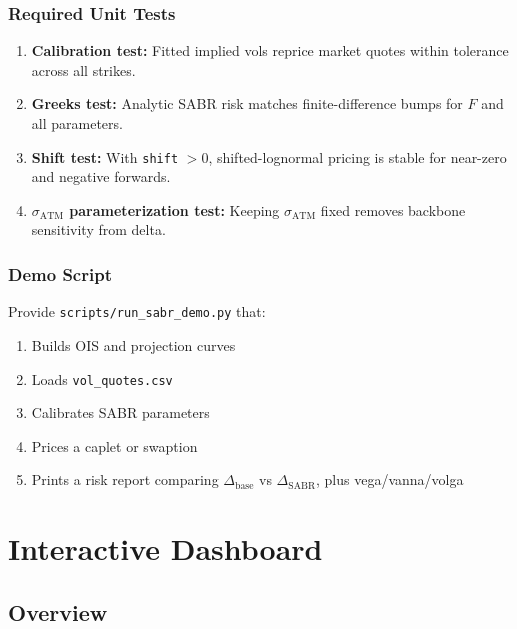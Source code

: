 \documentclass[12pt,a4paper]{report}
\newcommand{\code}[1]{\texttt{#1}}
\begin{document}
\subsection{Required Unit Tests}

\begin{enumerate}[leftmargin=1.2em,itemsep=0.1em]
    \item \textbf{Calibration test:} Fitted implied vols reprice market quotes within tolerance across all strikes.
    \item \textbf{Greeks test:} Analytic SABR risk matches finite-difference bumps for $F$ and all parameters.
    \item \textbf{Shift test:} With \code{shift} $> 0$, shifted-lognormal pricing is stable for near-zero and negative forwards.
    \item \textbf{$\sigma_{\text{ATM}}$ parameterization test:} Keeping $\sigma_{\text{ATM}}$ fixed removes backbone sensitivity from delta.
\end{enumerate}

\subsection{Demo Script}

Provide \code{scripts/run\_sabr\_demo.py} that:
\begin{enumerate}[leftmargin=1.2em,itemsep=0.1em]
    \item Builds OIS and projection curves
    \item Loads \code{vol\_quotes.csv}
    \item Calibrates SABR parameters
    \item Prices a caplet or swaption
    \item Prints a risk report comparing $\Delta_{\text{base}}$ vs $\Delta_{\text{SABR}}$, plus vega/vanna/volga
\end{enumerate}

\chapter{Interactive Dashboard}

\section{Overview}
\end{document}
